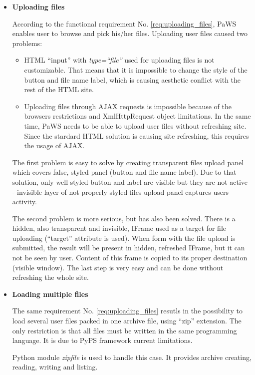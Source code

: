 \begin{itemize}
  \item {\bf Uploading files}
  
  According to the functional requirement No. \ref{req:uploading_files}, PaWS enables user to browse and pick his/her files. Uploading user files caused two problems:
  \begin{itemize}
    \item HTML ``input'' with \emph{type=``file''} used for uploading files is not customizable. That means that it is impossible to change the style of the button and file name label, which is causing aesthetic conflict with the rest of the HTML site.
    \item Uploading files through AJAX requests is impossible because of the browsers restrictions and XmlHttpRequest object limitations\cite{ajax_files_upload}. In the same time, PaWS needs to be able to upload user files without refreshing site. Since the stardard HTML solution is causing site refreshing, this requires the usage of AJAX.
  \end{itemize}
  
  The first problem is easy to solve by creating transparent files upload panel which covers false, styled panel (button and file name label). Due to that solution, only well styled button and label are visible but they are not active - invisible layer of not properly styled files upload panel captures users activity.
  
  The second problem is more serious, but has also been solved. There is a hidden, also transparent and invisible, IFrame used as a target for file uploading (``target'' attribute is used). When form with the file upload is submitted, the result will be present in hidden, refreshed IFrame, but it can not be seen by user. Content of this frame is copied to its proper destination (visible window). The last step is very easy and can be done without refreshing the whole site.
  
  \item {\bf Loading multiple files}
  
  The same requirement No. \ref{req:uploading_files} resutls in the possibility to load several user files packed in one archive file, using ``zip'' extension. The only restriction is that all files must be written in the same programming language. It is due to PyPS framework current limitations. 
  
  Python module \emph{zipfile}\cite{zipfile} is used to handle this case. It provides archive creating, reading, writing and listing.
  

\end{itemize}
